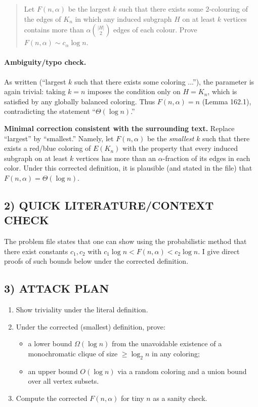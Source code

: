 \begin{quote}
Let $F(n,\alpha)$ be the largest $k$ such that there exists some $2$-colouring of the edges of $K_n$ in which any induced subgraph $H$ on at least $k$ vertices contains more than $\alpha\binom{|H|}{2}$ edges of each colour. Prove $F(n,\alpha)\sim c_{\alpha}\log n$.
\end{quote}

\paragraph{Ambiguity/typo check.}
As written (``largest $k$ such that there exists some coloring ...''), the parameter is again trivial: taking $k=n$ imposes the condition only on $H=K_n$, which is satisfied by any globally balanced coloring. Thus $F(n,\alpha)=n$ (Lemma 162.1), contradicting the statement ``$\Theta(\log n)$.''

\medskip
\noindent\textbf{Minimal correction consistent with the surrounding text.}
Replace ``largest'' by ``smallest.'' Namely, let $F(n,\alpha)$ be the \emph{smallest} $k$ such that there exists a red/blue coloring of $E(K_n)$ with the property that every induced subgraph on at least $k$ vertices has more than an $\alpha$-fraction of its edges in each color.
Under this corrected definition, it is plausible (and stated in the file) that $F(n,\alpha)=\Theta(\log n)$.

\subsection*{2) QUICK LITERATURE/CONTEXT CHECK}
The problem file states that one can show using the probabilistic method that there exist constants $c_1,c_2$ with $c_1\log n< F(n,\alpha) < c_2\log n$.
I give direct proofs of such bounds below under the corrected definition.

\subsection*{3) ATTACK PLAN}
\begin{enumerate}
\item Show triviality under the literal definition.
\item Under the corrected (smallest) definition, prove:
\begin{itemize}
\item a lower bound $\Omega(\log n)$ from the unavoidable existence of a monochromatic clique of size $\ge \log_2 n$ in any coloring;
\item an upper bound $O(\log n)$ via a random coloring and a union bound over all vertex subsets.
\end{itemize}
\item Compute the corrected $F(n,\alpha)$ for tiny $n$ as a sanity check.
\end{enumerate}

